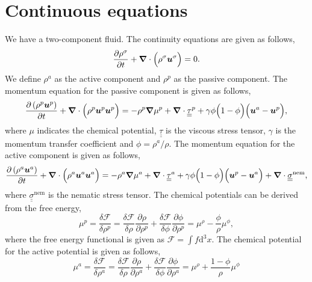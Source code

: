 \documentclass[fleqn,a4paper]{article} %
\numberwithin{equation}{section} %
\numberwithin{figure}{section} %
\numberwithin{algorithm}{section} %
\begin{document}
\section{Continuous equations}
We have a two-component fluid. The continuity equations are given as follows,
\begin{equation}
    \frac{\partial \rho^\sigma}{\partial t} + \bm{\nabla}\cdot \Bigl(\rho^\sigma \bm{u}^\sigma\Bigr) = 0. 
\end{equation}
We define $\rho^a$ as the active component and $\rho^p$ as the passive component. The momentum equation for the passive component is given as follows,
\begin{equation}
    \frac{\partial \left(\rho^p \bm{u}^p\right)}{\partial t} + \bm{\nabla} \cdot\Bigl(\rho^p \bm{u}^p\bm{u}^p\Bigr) = -\rho^p \bm{\nabla}\mu^p + \bm{\nabla}\cdot \underline{\underline{\tau}}^p + \gamma \phi \Bigl(1 - \phi\Bigr)\Bigl(\bm{u}^a - \bm{u}^p\Bigr),
\end{equation}
where $\mu$ indicates the chemical potential, $\underline{\underline{\tau}}$ is the viscous stress tensor, $\gamma$ is the momentum transfer coefficient and $\phi = \rho^a / \rho$. The momentum equation for the active component is given as follows,
\begin{equation}
    \frac{\partial \left(\rho^a \bm{u}^a\right)}{\partial t} + \bm{\nabla} \cdot\Bigl(\rho^a \bm{u}^a\bm{u}^a\Bigr) = -\rho^a \bm{\nabla}\mu^a + \bm{\nabla}\cdot \underline{\underline{\tau}}^a + \gamma \phi \Bigl(1 - \phi\Bigr)\Bigl(\bm{u}^p - \bm{u}^a\Bigr) + \bm{\nabla}\cdot \underline{\underline{\sigma}}^\text{nem},
\end{equation}
where $\underline{\underline{\sigma}}^\text{nem}$ is the nematic stress tensor. The chemical potentials can be derived from the free energy,
\begin{equation}
    \mu^p = \frac{\delta \mathcal{F}}{\delta \rho^p} = \frac{\delta \mathcal{F}}{\delta \rho}\frac{\partial \rho}{\partial \rho^p} + \frac{\delta \mathcal{F}}{\delta \phi}\frac{\partial \phi}{\partial \rho^p} = \mu^\rho - \frac{\phi}{\rho}\mu^\phi,
\end{equation}
where the free energy functional is given as $\mathcal{F} = \int f \mathrm{d}^3 x$. The chemical potential for the active potential is given as follows,
\begin{equation}
    \mu^a = \frac{\delta \mathcal{F}}{\delta \rho^a} = \frac{\delta \mathcal{F}}{\delta \rho}\frac{\partial \rho}{\partial \rho^a} + \frac{\delta \mathcal{F}}{\delta \phi}\frac{\partial \phi}{\partial \rho^a} = \mu^\rho + \frac{1 - \phi}{\rho}\mu^\phi
\end{equation}
\end{document}
